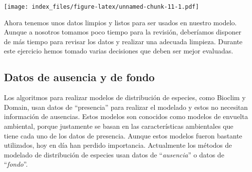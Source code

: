 \documentclass[]{article}
\newenvironment{Shaded}{\begin{snugshade}}{\end{snugshade}}
\newcommand{\KeywordTok}[1]{\textcolor[rgb]{0.13,0.29,0.53}{\textbf{{#1}}}}
\newcommand{\DataTypeTok}[1]{\textcolor[rgb]{0.13,0.29,0.53}{{#1}}}
\newcommand{\DecValTok}[1]{\textcolor[rgb]{0.00,0.00,0.81}{{#1}}}
\newcommand{\FloatTok}[1]{\textcolor[rgb]{0.00,0.00,0.81}{{#1}}}
\newcommand{\StringTok}[1]{\textcolor[rgb]{0.31,0.60,0.02}{{#1}}}
\newcommand{\CommentTok}[1]{\textcolor[rgb]{0.56,0.35,0.01}{\textit{{#1}}}}
\newcommand{\OtherTok}[1]{\textcolor[rgb]{0.56,0.35,0.01}{{#1}}}
\newcommand{\NormalTok}[1]{{#1}}
\begin{document}
\begin{Shaded}
\end{Shaded}

\texttt{[image: index\_files/figure-latex/unnamed-chunk-11-1.pdf]}

Ahora tenemos unos datos limpios y listos para ser usados en nuestro
modelo. Aunque a nosotros tomamos poco tiempo para la revisión,
deberíamos disponer de más tiempo para revisar los datos y realizar una
adecuada limpieza. Durante este ejercicio hemos tomado varias decisiones
que deben ser mejor evaluadas.

\subsection{Datos de ausencia y de
fondo}\label{datos-de-ausencia-y-de-fondo}

Los algoritmos para realizar modelos de distribución de especies, como
Bioclim y Domain, usan datos de ``presencia'' para realizar el modelado
y estos no necesitan información de ausencias. Estos modelos son
conocidos como modelos de envuelta ambiental, porque justamente se basan
en las características ambientales que tiene cada uno de los datos de
presencia. Aunque estos modelos fueron bastante utilizados, hoy en día
han perdido importancia. Actualmente los métodos de modelado de
distribución de especies usan datos de ``\emph{ausencia}'' o datos de
``\emph{fondo}''.
\end{document}

